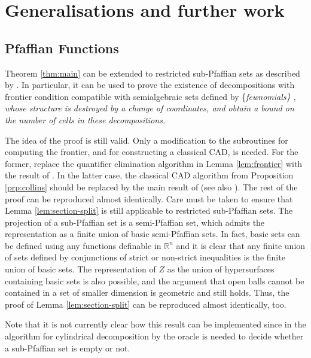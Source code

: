 \documentclass[
]{book}
\theoremstyle{definition}
\theoremstyle{definition}
\theoremstyle{definition}
\theoremstyle{definition}
\theoremstyle{remark}
\begin{document}
\hypertarget{generalisations-and-further-work}{%
\section{Generalisations and further work}\label{generalisations-and-further-work}}

\hypertarget{sec:pfaffian}{%
\subsection{Pfaffian Functions}\label{sec:pfaffian}}

Theorem \ref{thm:main} can be extended to restricted sub-Pfaffian sets as described by \citet{gv04}.
In particular, it can be used to prove the existence of decompositions with frontier condition compatible with semialgebraic sets defined by \{\em fewnomials\} \citep[Section 2.6]{gv04}, whose structure is destroyed by a change of coordinates, and obtain a bound on the number of cells in these decompositions.

The idea of the proof is still valid. Only a modification to the subroutines for computing the frontier, and for constructing a classical CAD, is needed. For the former, replace the quantifier elimination algorithm in Lemma \ref{lem:frontier} with the result of \citep[Section 5]{gv04}. In the latter case, the classical CAD algorithm from Proposition \ref{prp:collins} should be replaced by the main result of \citet{gv01} (see also \citep[Section 7]{gv04}). The rest of the proof can be reproduced almost identically.
Care must be taken to ensure that Lemma \ref{lem:section-split} is still applicable to restricted sub-Pfaffian sets. The projection of a sub-Pfaffian set is a semi-Pfaffian set, which admits the representation as a finite union of basic semi-Pfaffian sets.
In fact, basic sets can be defined using any functions definable in \(\mathbb{R}^n\) and it is clear that any finite union of sets defined by conjunctions of strict or non-strict inequalities is the finite union of basic sets. The representation of \(Z\) as the union of hypersurfaces containing basic sets is also possible, and the argument that open balls cannot be contained in a set of smaller dimension is geometric and still holds. Thus, the proof of Lemma \ref{lem:section-split} can be reproduced almost identically, too.

Note that it is not currently clear how this result can be implemented since in the algorithm for cylindrical decomposition by \citet{gv01} the oracle is needed to decide whether a sub-Pfaffian set is empty or not.
\end{document}
